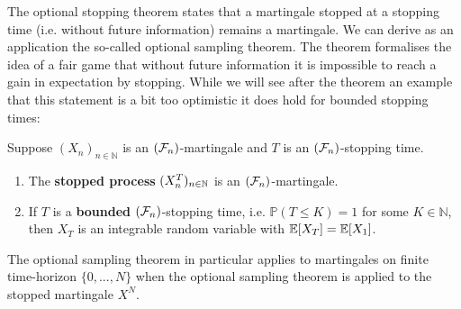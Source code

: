The optional stopping theorem states that a martingale stopped at a stopping time (i.e. without future information) remains a martingale. We can derive as an application the so-called optional sampling theorem. The theorem formalises the idea of a fair game that without future information it is impossible to reach a gain in expectation by stopping. While we will see after the theorem an example that this statement is a bit too optimistic it does hold for bounded stopping times:
\begin{lsatzwichtig}
\begin{theorem}\label{optional_stopping}
	Suppose $(X_n)_{n\in\mathbb{N}}$ is an $(\mathcal{F}_n)$-martingale and $T$ is an $(\mathcal{F}_n)$-stopping time.
	\begin{enumerate}[label=(\roman*)]
		\item The \textbf{stopped process} $(X_n^T)_{n\in\mathbb{N}}$ is an $(\mathcal{F}_n)$-martingale.
		\item
			If $T$ is a \textbf{bounded} $(\mathcal{F}_n)$-stopping time, i.e. $\mathbb{P}(T \leq K ) = 1$ for some $K\in \mathbb{N}$, then $X_T$ is an integrable random variable with $\mathbb{E}[X_T] = \mathbb{E}[X_1]$.
	\end{enumerate}
\end{theorem}
\end{lsatzwichtig}
The optional sampling theorem in particular applies to martingales on finite time-horizon $\{0,...,N\}$ when the optional sampling theorem is applied to the stopped martingale $X^N$.



